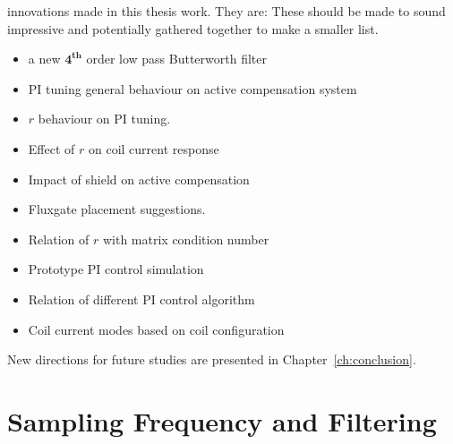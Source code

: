 innovations made in this thesis work.  They are: {\color{red}These
should be made to sound impressive and potentially gathered together
to make a smaller list.}
\begin{itemize}
    \item a new $\mathbf{4^{th}}$ order low pass Butterworth filter
    \item PI tuning general behaviour on active compensation system 
    \item $r$ behaviour on PI tuning.
    \item Effect of $r$ on coil current response
    \item Impact of shield on active compensation
    \item Fluxgate placement suggestions.
    \item Relation of $r$ with matrix condition number
    \item Prototype PI control simulation
    \item Relation of different PI control algorithm
    \item Coil current modes based on coil configuration
\end{itemize}
New directions for future studies are presented in
Chapter~\ref{ch:conclusion}.



\section{Sampling Frequency and Filtering}\label{sec:freq}

